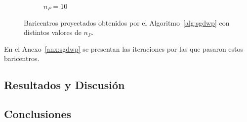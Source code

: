 \begin{figure}[htbp]
\begin{subfigure}[b]{0.23\textwidth}
        \caption{$n_P=10$}
        \label{fig:bar-SGDWP-pe-10}
    \end{subfigure}
    \caption{Baricentros proyectados obtenidos por el Algoritmo~\ref{alg:sgdwp} con distintos valores de $n_P$.}
    \label{fig:bar-SGDWP-pe}
\end{figure}

En el Anexo~\ref{anx:sgdwp} se presentan las iteraciones por las que pasaron estos baricentros.




\subsection{Resultados y Discusión}\label{ssec:sgdwp-resultados-discusion}  %



\subsection{Conclusiones}\label{ssec:sgdwp-conclusiones}  %

